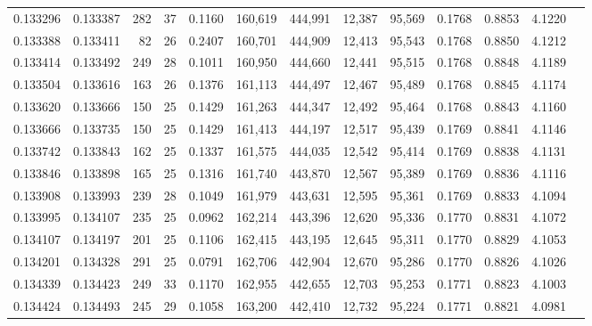 \begin{tabular}{rrrrrrrrrrrrr}
0.133296 & 0.133387 &   282 &  37 &                                     0.1160 & 160,619 & 444,991 &  12,387 &  95,569 & 0.1768 & 0.8853 & 4.1220 \\
0.133388 & 0.133411 &    82 &  26 &                                     0.2407 & 160,701 & 444,909 &  12,413 &  95,543 & 0.1768 & 0.8850 & 4.1212 \\
0.133414 & 0.133492 &   249 &  28 &                                     0.1011 & 160,950 & 444,660 &  12,441 &  95,515 & 0.1768 & 0.8848 & 4.1189 \\
0.133504 & 0.133616 &   163 &  26 &                                     0.1376 & 161,113 & 444,497 &  12,467 &  95,489 & 0.1768 & 0.8845 & 4.1174 \\
0.133620 & 0.133666 &   150 &  25 &                                     0.1429 & 161,263 & 444,347 &  12,492 &  95,464 & 0.1768 & 0.8843 & 4.1160 \\
0.133666 & 0.133735 &   150 &  25 &                                     0.1429 & 161,413 & 444,197 &  12,517 &  95,439 & 0.1769 & 0.8841 & 4.1146 \\
0.133742 & 0.133843 &   162 &  25 &                                     0.1337 & 161,575 & 444,035 &  12,542 &  95,414 & 0.1769 & 0.8838 & 4.1131 \\
0.133846 & 0.133898 &   165 &  25 &                                     0.1316 & 161,740 & 443,870 &  12,567 &  95,389 & 0.1769 & 0.8836 & 4.1116 \\
0.133908 & 0.133993 &   239 &  28 &                                     0.1049 & 161,979 & 443,631 &  12,595 &  95,361 & 0.1769 & 0.8833 & 4.1094 \\
0.133995 & 0.134107 &   235 &  25 &                                     0.0962 & 162,214 & 443,396 &  12,620 &  95,336 & 0.1770 & 0.8831 & 4.1072 \\
0.134107 & 0.134197 &   201 &  25 &                                     0.1106 & 162,415 & 443,195 &  12,645 &  95,311 & 0.1770 & 0.8829 & 4.1053 \\
0.134201 & 0.134328 &   291 &  25 &                                     0.0791 & 162,706 & 442,904 &  12,670 &  95,286 & 0.1770 & 0.8826 & 4.1026 \\
0.134339 & 0.134423 &   249 &  33 &                                     0.1170 & 162,955 & 442,655 &  12,703 &  95,253 & 0.1771 & 0.8823 & 4.1003 \\
0.134424 & 0.134493 &   245 &  29 &                                     0.1058 & 163,200 & 442,410 &  12,732 &  95,224 & 0.1771 & 0.8821 & 4.0981 \\

\end{tabular}
